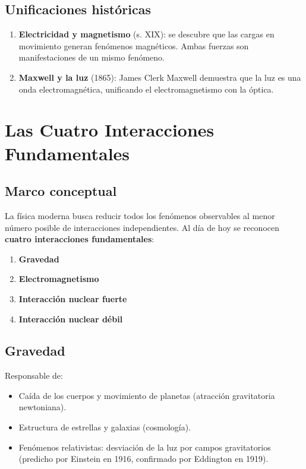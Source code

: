 \documentclass[12pt,a4paper]{article}
\begin{document}
\subsection{Unificaciones históricas}

\begin{keybox}
\begin{enumerate}[nosep]
  \item \textbf{Electricidad y magnetismo} (s. XIX): se descubre que las cargas en movimiento generan fenómenos magnéticos. Ambas fuerzas son manifestaciones de un mismo fenómeno.
  \item \textbf{Maxwell y la luz} (1865): James Clerk Maxwell demuestra que la luz es una onda electromagnética, unificando el electromagnetismo con la óptica.
\end{enumerate}
\end{keybox}

\section{Las Cuatro Interacciones Fundamentales}

\subsection{Marco conceptual}

La física moderna busca reducir todos los fenómenos observables al menor número posible de interacciones independientes. Al día de hoy se reconocen \textbf{cuatro interacciones fundamentales}:

\begin{enumerate}[nosep]
  \item \textbf{Gravedad}
  \item \textbf{Electromagnetismo}
  \item \textbf{Interacción nuclear fuerte}
  \item \textbf{Interacción nuclear débil}
\end{enumerate}

\subsection{Gravedad}

Responsable de:
\begin{itemize}[nosep]
  \item Caída de los cuerpos y movimiento de planetas (atracción gravitatoria newtoniana).
  \item Estructura de estrellas y galaxias (cosmología).
  \item Fenómenos relativistas: desviación de la luz por campos gravitatorios (predicho por Einstein en 1916, confirmado por Eddington en 1919).
\end{itemize}
\end{document}
